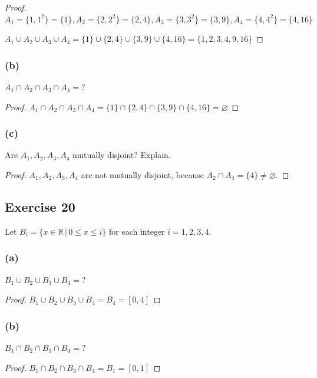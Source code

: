 \documentclass[14pt]{extarticle}
\newcommand{\es}{\varnothing}
\newcommand{\R}{\mathbb{R}}
\begin{document}
\begin{proof}
\(A_1 = \{1, 1^2\} = \{1\}, A_2 = \{2, 2^2\} = \{2, 4\}, A_3 = \{3, 3^2\} = \{3, 9\}, A_4 = \{4, 4^2\} = \{4, 16\}\)

\(A_1 \cup A_2 \cup A_3 \cup A_4 = \{1\} \cup \{2, 4\} \cup \{3, 9\} \cup \{4, 16\} = \{1, 2, 3, 4, 9, 16\}\)
\end{proof}

\subsubsection{(b)}
\(A_1 \cap A_2 \cap A_3 \cap A_4 = ?\)

\begin{proof}
\(A_1 \cap A_2 \cap A_3 \cap A_4 = \{1\} \cap \{2, 4\} \cap \{3, 9\} \cap \{4, 16\} = \es\)
\end{proof}

\subsubsection{(c)}
Are \(A_1, A_2, A_3, A_4\) mutually disjoint? Explain.

\begin{proof}
\(A_1, A_2, A_3, A_4\) are not mutually disjoint, because \(A_2 \cap A_4 = \{4\} \neq \es\).
\end{proof}

\subsection{Exercise 20}
Let \(B_i = \{x \in \R \, | \, 0 \leq x \leq i\}\) for each integer \(i = 1, 2, 3, 4\).

\subsubsection{(a)}
\(B_1 \cup B_2 \cup B_3 \cup B_4 = ?\)

\begin{proof}
\(B_1 \cup B_2 \cup B_3 \cup B_4 = B_4 = [0, 4]\)
\end{proof}

\subsubsection{(b)}
\(B_1 \cap B_2 \cap B_3 \cap B_4 = ?\)

\begin{proof}
\(B_1 \cap B_2 \cap B_3 \cap B_4 = B_1 = [0, 1]\)
\end{proof}
\end{document}
